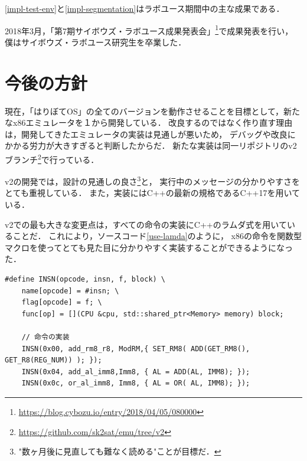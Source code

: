 \documentclass[10pt,a4j]{jsarticle}
\begin{document}
\ref{impl-test-env}と\ref{impl-segmentation}はラボユース期間中の主な成果である．

2018年3月，「第7期サイボウズ・ラボユース成果発表会」\footnote{\url{https://blog.cybozu.io/entry/2018/04/05/080000}}で成果発表を行い，
僕はサイボウズ・ラボユース研究生を卒業した．

\section{今後の方針}

現在，「はりぼてOS」の全てのバージョンを動作させることを目標として，新たなx86エミュレータを１から開発している．
改良するのではなく作り直す理由は，開発してきたエミュレータの実装は見通しが悪いため，
デバッグや改良にかかる労力が大きすぎると判断したからだ．
新たな実装は同一リポジトリのv2ブランチ\footnote{\url{https://github.com/sk2sat/emu/tree/v2}}で行っている．

v2の開発では，設計の見通しの良さ\footnote{"数ヶ月後に見直しても難なく読める"ことが目標だ．}と，
実行中のメッセージの分かりやすさをとても重視している．
また，実装にはC++の最新の規格であるC++17を用いている．

v2での最も大きな変更点は，すべての命令の実装にC++のラムダ式を用いていることだ．
これにより，ソースコード\ref{use-lamda}のように，
x86の命令を関数型マクロを使ってとても見た目に分かりやすく実装することができるようになった．

\begin{lstlisting}[caption=ラムダ式を使った命令の実装の一部,label=use-lamda]
#define INSN(opcode, insn, f, block) \
	name[opcode] = #insn; \
	flag[opcode] = f; \
	func[op] = [](CPU &cpu, std::shared_ptr<Memory> memory) block;

	// 命令の実装
	INSN(0x00, add_rm8_r8, ModRM,{ SET_RM8( ADD(GET_RM8(), GET_R8(REG_NUM)) ); });
	INSN(0x04, add_al_imm8,Imm8, { AL = ADD(AL, IMM8); });
	INSN(0x0c, or_al_imm8, Imm8, { AL = OR( AL, IMM8); });
\end{lstlisting}

\end{document}
